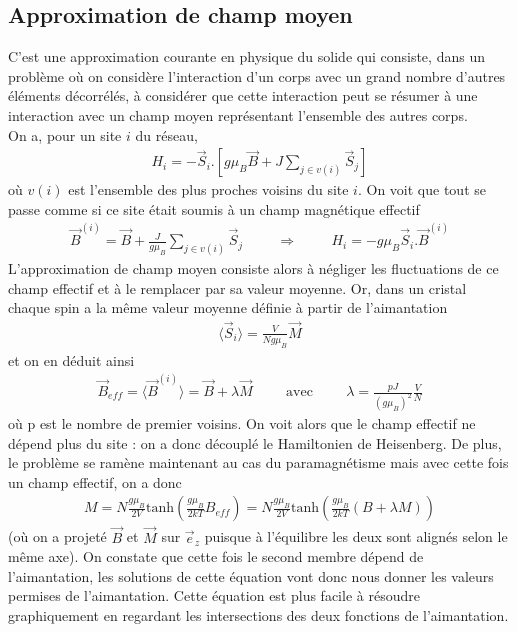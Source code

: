 \documentclass[12pt,prb,aps,epsf]{article}
\begin{document}
\subsection{Approximation de champ moyen}
C'est une approximation courante en physique du solide qui consiste, dans un problème où on considère l'interaction d'un corps avec un grand nombre d'autres éléments décorrélés, à considérer que cette interaction peut se résumer à une interaction avec un champ moyen représentant l'ensemble des autres corps.\\

On a, pour un site $i$ du réseau,
\begin{eqnarray}
H_i = -\vec{S}_i . [g\mu_B \vec{B} + J \sum_{j\in v(i)}\vec{S}_j]
\end{eqnarray}
où $v(i)$ est l'ensemble des plus proches voisins du site $i$. On voit que tout se passe comme si ce site était soumis à un champ magnétique effectif 
\begin{eqnarray}
\vec{B}^{(i)} = \vec{B} + \frac{J}{g\mu_B}\sum_{j\in v(i)} \vec{S}_j\hspace{1cm}\Longrightarrow\hspace{1cm} H_i = -g\mu_B\vec{S}_i.\vec{B}^{(i)}
\end{eqnarray}
L'approximation de champ moyen consiste alors à négliger les fluctuations de ce champ effectif et à le remplacer par sa valeur moyenne. Or, dans un cristal chaque spin a la même valeur moyenne définie à partir de l'aimantation
\begin{eqnarray}
\langle\vec{S}_i\rangle = \frac{V}{Ng\mu_B}\vec{M}
\end{eqnarray} 
et on en déduit ainsi 
\begin{eqnarray}
\vec{B}_{eff} = \langle\vec{B}^{(i)}\rangle = \vec{B} + \lambda \vec{M} \hspace{1cm}\mathrm{avec}\hspace{1cm}\lambda = \frac{pJ}{(g\mu_B)^2}\frac{V}{N}
\end{eqnarray}
où p est le nombre de premier voisins. On voit alors que le champ effectif ne dépend plus du site : on a donc découplé le Hamiltonien de Heisenberg. De plus, le problème se ramène maintenant au cas du paramagnétisme mais avec cette fois un champ effectif, on a donc 
\begin{eqnarray}
M = N\frac{g\mu_B}{2V}\mathrm{tanh}\left(\frac{g\mu_B}{2kT}B_{eff}\right) =  N\frac{g\mu_B}{2V}\mathrm{tanh}\left(\frac{g\mu_B}{2kT}(B+\lambda M)\right)
\end{eqnarray}
(où on a projeté $\vec{B}$ et $\vec{M}$ sur $\vec{e}_z$ puisque à l'équilibre les deux sont alignés selon le même axe). On constate que cette fois le second membre dépend de l'aimantation, les solutions de cette équation vont donc nous donner les valeurs permises de l'aimantation. Cette équation est plus facile à résoudre graphiquement en regardant les intersections des deux fonctions de l'aimantation.
\end{document}
